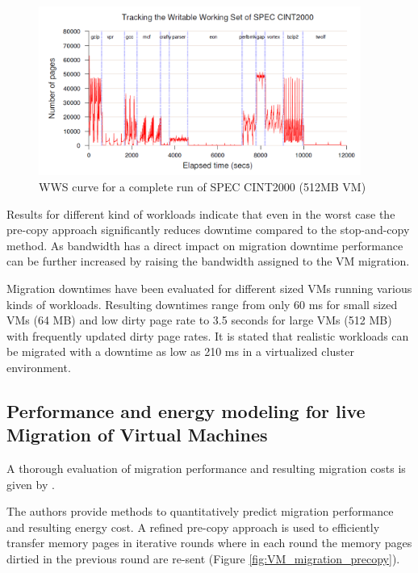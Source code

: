 \begin{figure}
	\centering
		\includegraphics[width=0.94\textwidth]{figures/state_of_the_art/tracking_writable_working_set.PNG}
	\caption{WWS curve for a complete run of SPEC CINT2000 (512MB VM) \cite{clark2005live}}
	\label{fig:tracking_writable_working_set}
\end{figure}



Results for different kind of workloads indicate that even in the worst case the pre-copy approach significantly reduces downtime compared to the stop-and-copy method. As bandwidth has a direct impact on migration downtime performance can be further increased by raising the bandwidth assigned to the VM migration. 

Migration downtimes have been evaluated for different sized VMs running various kinds of workloads. Resulting downtimes range from only 60 ms for small sized VMs (64 MB) and low dirty page rate to 3.5 seconds for large VMs (512 MB) with frequently updated dirty page rates. It is stated that realistic workloads can be migrated with a downtime as low as 210 ms in a virtualized cluster environment. 


\subsection{Performance and energy modeling for live Migration of Virtual Machines}

A thorough evaluation of migration performance and resulting migration costs is given by \cite{liu2013performance}. 

The authors provide methods to quantitatively predict migration performance and resulting energy cost. A refined pre-copy approach is used to efficiently transfer memory pages in iterative rounds where in each round the memory pages dirtied in the previous round are re-sent (Figure \ref{fig:VM_migration_precopy}). 

